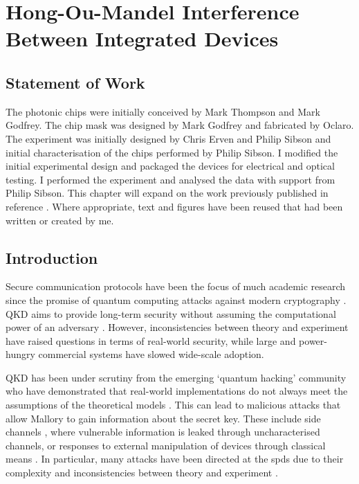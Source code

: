 %
\graphicspath{{./chapters/chapter03/fig03/}}

\let\textcircled=\pgftextcircled
\chapter{Hong-Ou-Mandel Interference Between Integrated Devices}
\label{chap:hom}

\section*{Statement of Work}

The photonic chips were initially conceived by Mark Thompson and Mark Godfrey. The chip mask was designed by Mark Godfrey and fabricated by Oclaro. The experiment was initially designed by Chris Erven and Philip Sibson and initial characterisation of the chips performed by Philip Sibson. I modified the initial experimental design and packaged the devices for electrical and optical testing. I performed the experiment and analysed the data with support from Philip Sibson. This chapter will expand on the work previously published in reference \cite{semenenko2019}. Where appropriate, text and figures have been reused that had been written or created by me.

\section{Introduction}

Secure communication protocols have been the focus of much academic research since the promise of quantum computing attacks against modern cryptography \cite{shor1994}. \Ac{QKD} aims to provide long-term security without assuming the computational power of an adversary \cite{BB84, E91}. However, inconsistencies between theory and experiment have raised questions in terms of real-world security, while large and power-hungry commercial systems have slowed wide-scale adoption.

\Ac{QKD} has been under scrutiny from the emerging `quantum hacking' community who have demonstrated that real-world implementations do not always meet the assumptions of the theoretical models \cite{mdi-qkd}. This can lead to malicious attacks that allow Mallory to gain information about the secret key. These include side channels \cite{Lamas-Linares2007}, where vulnerable information is leaked through uncharacterised channels, or responses to external manipulation of devices through classical means \cite{Gisin2006}. In particular, many attacks have been directed at the \acp{spd} due to their complexity and inconsistencies between theory and experiment \cite{Lydersen2010b, Zhao2008Quantum, Makarov2006}.


